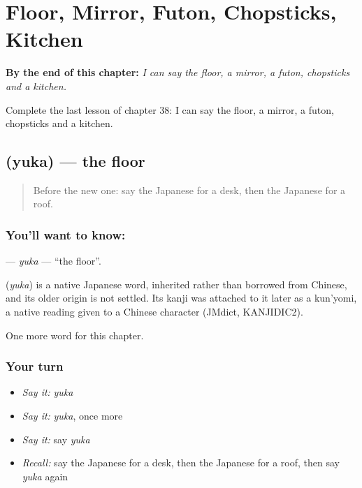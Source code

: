 
\chapter{Floor, Mirror, Futon, Chopsticks, Kitchen}
\label{ch:ja-floor-mirror-futon-chopsticks-kitchen}

\begin{chapteropening}
\textbf{By the end of this chapter:} \emph{I can say the floor, a mirror, a futon, chopsticks and a kitchen.}

Complete the last lesson of chapter 38: I can say the floor, a mirror, a futon, chopsticks and a kitchen.
\end{chapteropening}

\section[\texorpdfstring{\ja{ゆか} (yuka)}{ゆか (yuka)}]{ (yuka) — the floor}

\label{lesson:JA-C38-yuka}



\begin{quote}
Before the new one: say the Japanese for a desk, then the Japanese for a roof.
\end{quote}

\subsection*{You'll want to know: }
\textbf{} — \emph{yuka} — \textquotedblleft{}the floor\textquotedblright{}.

\begin{cousinweb}
\textbf{} (\emph{yuka}) is a native Japanese word, inherited rather than borrowed from Chinese, and its older origin is not settled. Its kanji was attached to it later as a kun'yomi, a native reading given to a Chinese character (JMdict, KANJIDIC2).
\end{cousinweb}

\begin{grammarlens}[title={What you've built}]
One more word for this chapter.
\end{grammarlens}

\subsection*{Your turn}
\begin{itemize}
\raggedright
  \item \emph{Say it:} \emph{yuka}
  \item \emph{Say it:} \emph{yuka}, once more
  \item \emph{Say it:} say \emph{yuka}
  \item \emph{Recall:} say the Japanese for a desk, then the Japanese for a roof, then say \emph{yuka} again
\end{itemize}

